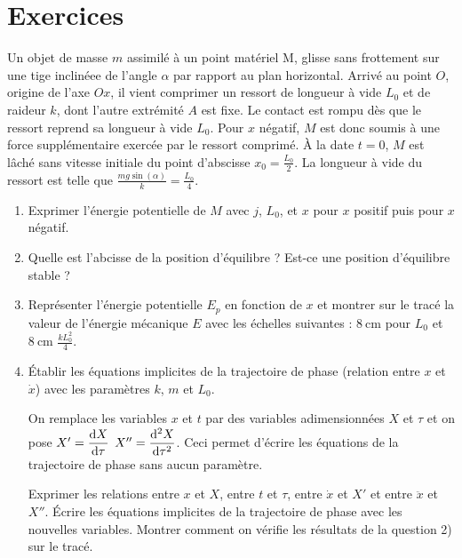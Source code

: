 \section{Exercices}
\label{chap5-sec:exercices}
\begin{exercice}
	Un objet de masse $m$ assimilé à un point matériel M, glisse sans frottement sur une tige inclinéee de l'angle $\alpha$ par rapport au plan horizontal. 
	Arrivé au point $O$, origine de l'axe $Ox$, il vient comprimer un ressort de longueur à vide $L_0$ et de raideur $k$, dont l'autre extrémité $A$ est fixe. Le contact est rompu dès que le ressort reprend sa longueur à vide $L_0$. Pour $x$ négatif, $M$ est donc soumis à une force supplémentaire exercée par le ressort comprimé.
	À la date $t=0$, $M$ est lâché sans vitesse initiale du point d'abscisse $x_0=\frac{L_0}{2}$. La longueur à vide du ressort est telle que $\frac{mg \sin(\alpha)}{k} = \frac{L_0}{4}$.
	\begin{enumerate}
		\item Exprimer l'énergie potentielle de $M$ avec $j$, $L_0$, et $x$ pour $x$ positif puis pour $x$ négatif.
		\item Quelle est l'abcisse de la position d'équilibre ? Est-ce une position d'équilibre stable ?
		\item Représenter l'énergie potentielle $E_p$ en fonction de $x$ et montrer sur le tracé la valeur de l'énergie mécanique $E$ avec les échelles suivantes : $\SI{8}{\centi\meter}$ pour $L_0$ et $\SI{8}{\centi\meter}$ $\frac{k L_0^2}{4}$.
		\item Établir les équations implicites de la trajectoire de phase (relation entre $x$ et $\dot{x}$) avec les paramètres $k$, $m$ et $L_0$. 
			
		On remplace les variables $x$ et $t$ par des variables adimensionnées $X$ et $\tau$ et on pose $X' = \dfrac{\mathrm{d} X}{\mathrm{d} \tau}$  $X'' = \dfrac{\mathrm{d}^2 X}{\mathrm{d} {\tau}^2}$. Ceci permet d'écrire les équations de la trajectoire de phase sans aucun paramètre.

		Exprimer les relations entre $x$ et $X$, entre $t$ et $\tau$, entre $\dot{x}$ et $X'$ et entre $\ddot{x}$ et $X''$.
		Écrire les équations implicites de la trajectoire de phase avec les nouvelles variables. Montrer comment on vérifie les résultats de la question 2) sur le tracé.
	\end{enumerate}
\end{exercice}
